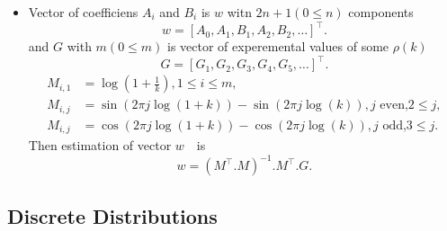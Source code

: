 \documentclass[titlepage,fleqn]{article}%
\begin{document}
\begin{itemize}
\item Vector of coefficiens $A_{i}$ and $B_{i}$ is $w$ witn $2n+1(0\leq n)$
components \ \
\[
w=\left[  A_{0},A_{1},B_{1},A_{2},B_{2},\ldots\right]  ^{\top}.
\]
and $G$ with $m(0\leq m)$ is vector of experemental values of some $\rho(k)$%
\[
G=\left[  G_{1},G_{2},G_{3},G_{4},G_{5},\ldots\right]  ^{\top}.
\]%
\begin{align*}
M_{i,1}  &  =\log\left(  1+\frac{1}{k}\right)  ,1\leq i\leq m,\\
M_{i,j}  &  =\sin\left(  2\pi j\log(1+k)\right)  -\sin\left(  2\pi
j\log(k)\right)  ,j\text{ even,}2\leq j,\\
M_{i,j}  &  =\cos\left(  2\pi j\log(1+k)\right)  -\cos\left(  2\pi
j\log(k)\right)  ,j\text{ odd,}3\leq j.
\end{align*}
Then estimation of vector $w$\ \ is%
\[
w=\left(  M^{\top}.M\right)  ^{-1}.M^{\top}.G.
\]

\end{itemize}

\subsection{Discrete Distributions}%
\end{document}
